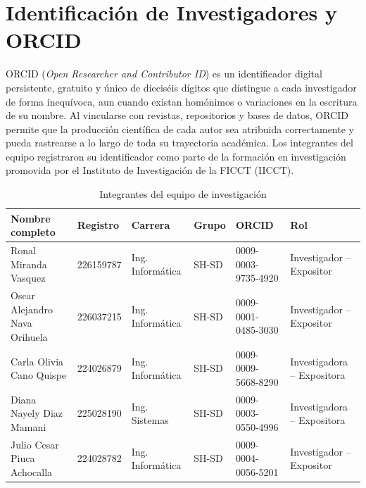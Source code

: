 \setcounter{page}{2}
\chapter*{Identificación de Investigadores y ORCID}
ORCID (\emph{Open Researcher and Contributor ID}) es un identificador digital persistente, gratuito y único de dieciséis dígitos que distingue a cada investigador de forma inequívoca, aun cuando existan homónimos o variaciones en la escritura de su nombre. Al vincularse con revistas, repositorios y bases de datos, ORCID permite que la producción científica de cada autor sea atribuida correctamente y pueda rastrearse a lo largo de toda su trayectoria académica. Los integrantes del equipo registraron su identificador como parte de la formación en investigación promovida por el Instituto de Investigación de la FICCT (IICCT).

\begin{table}[H]
\caption{Integrantes del equipo de investigación}\label{tab:integrantes}
\small\setlength{\tabcolsep}{4pt}
\begin{tabularx}{\textwidth}{@{}>{\raggedright}X l >{\raggedright}p{2.3cm} l l >{\raggedright\arraybackslash}p{2.4cm}@{}}
\toprule
Nombre completo & Registro & Carrera & Grupo & ORCID & Rol \\
\midrule
Ronal Miranda Vasquez & 226159787 & Ing. Informática & SH-SD & 0009-0003-9735-4920 & Investigador -- Expositor \\
Oscar Alejandro Nava Orihuela & 226037215 & Ing. Informática & SH-SD & 0009-0001-0485-3030 & Investigador -- Expositor \\
Carla Olivia Cano Quispe & 224026879 & Ing. Informática & SH-SD & 0009-0009-5668-8290 & Investigadora -- Expositora \\
Diana Nayely Diaz Mamani & 225028190 & Ing. Sistemas & SH-SD & 0009-0003-0550-4996 & Investigadora -- Expositora \\
Julio Cesar Piuca Achocalla & 224028782 & Ing. Informática & SH-SD & 0009-0004-0056-5201 & Investigador -- Expositor \\
\bottomrule
\end{tabularx}
\par{}
\end{table}

